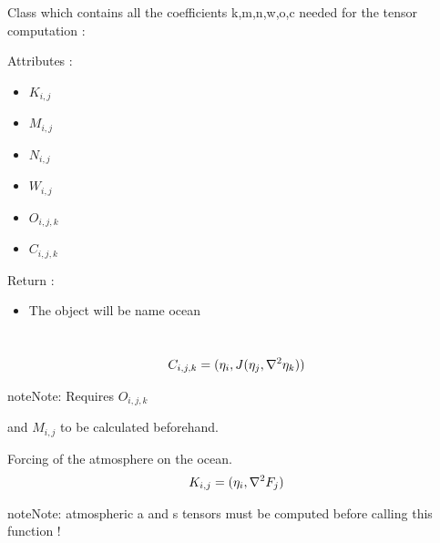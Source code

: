 \documentclass[letterpaper,10pt,english]{sphinxmanual}
\begin{document}

\begin{fulllineitems}
\label{rstfiles/inprod_analytic:inprod_analytic.ocean_tensors}
Class which contains all the coefficients k,m,n,w,o,c     needed for the tensor computation :

Attributes :
\begin{itemize}
\item {} 
\(K_{i,j}\)

\item {} 
\(M_{i,j}\)

\item {} 
\(N_{i,j}\)

\item {} 
\(W_{i,j}\)

\item {} 
\(O_{i,j,k}\)

\item {} 
\(C_{i,j,k}\)

\end{itemize}

Return :
\begin{itemize}
\item {} 
The object will be name ocean

\end{itemize}

\begin{fulllineitems}
\label{rstfiles/inprod_analytic:inprod_analytic.ocean_tensors.calculate_C_oc}~\begin{gather}
\begin{split}C_{i,j,k} = (\eta_i, J(\eta_j,\nabla^2 \eta_k))\end{split}\notag
\end{gather}
\begin{notice}{note}{Note:}
Requires \(O_{i,j,k}\) 
\end{notice}

and \(M_{i,j}\) to be calculated beforehand.

\end{fulllineitems}


\begin{fulllineitems}
\label{rstfiles/inprod_analytic:inprod_analytic.ocean_tensors.calculate_K}
Forcing of the atmosphere on the ocean.
\begin{gather}
\begin{split}K_{i,j} = (\eta_i, \nabla^2 F_j)\end{split}\notag
\end{gather}
\begin{notice}{note}{Note:}
atmospheric a and s tensors must be computed before calling
this function !
\end{notice}


\end{fulllineitems}
\end{fulllineitems}
\end{document}
